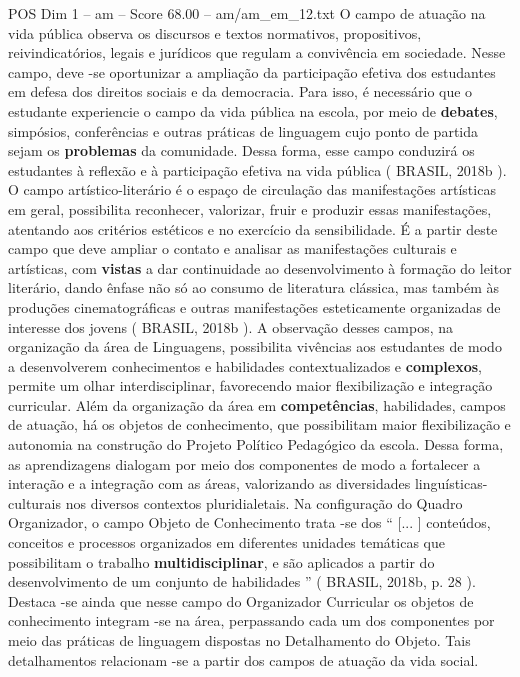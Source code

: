 \begin{textsample}{POS Dim 1 – am – Score 68.00 – am/am\_em\_12.txt}
O campo de atuação na vida pública observa os discursos e textos normativos, propositivos, reivindicatórios, legais e jurídicos que regulam a convivência em sociedade.
Nesse campo, deve -se oportunizar a ampliação da participação efetiva dos estudantes em defesa dos direitos sociais e da democracia.
Para isso, é necessário que o estudante experiencie o campo da vida pública na escola, por meio de \textbf{debates}, simpósios, conferências e outras práticas de linguagem cujo ponto de partida sejam os \textbf{problemas} da comunidade.
Dessa forma, esse campo conduzirá os estudantes à reflexão e à participação efetiva na vida pública ( BRASIL, 2018b ).
O campo artístico-literário é o espaço de circulação das manifestações artísticas em geral, possibilita reconhecer, valorizar, fruir e produzir essas manifestações, atentando aos critérios estéticos e no exercício da sensibilidade.
É a partir deste campo que deve ampliar o contato e analisar as manifestações culturais e artísticas, com \textbf{vistas} a dar continuidade ao desenvolvimento à formação do leitor literário, dando ênfase não só ao consumo de literatura clássica, mas também às produções cinematográficas e outras manifestações esteticamente organizadas de interesse dos jovens ( BRASIL, 2018b ).
A observação desses campos, na organização da área de Linguagens, possibilita vivências aos estudantes de modo a desenvolverem conhecimentos e habilidades contextualizados e \textbf{complexos}, permite um olhar interdisciplinar, favorecendo maior flexibilização e integração curricular.
Além da organização da área em \textbf{competências}, habilidades, campos de atuação, há os objetos de conhecimento, que possibilitam maior flexibilização e autonomia na construção do Projeto Político Pedagógico da escola.
Dessa forma, as aprendizagens dialogam por meio dos componentes de modo a fortalecer a interação e a integração com as áreas, valorizando as diversidades linguísticas-culturais nos diversos contextos pluridialetais.
Na configuração do Quadro Organizador, o campo Objeto de Conhecimento trata -se dos “ [... ] conteúdos, conceitos e processos organizados em diferentes unidades temáticas que possibilitam o trabalho \textbf{multidisciplinar}, e são aplicados a partir do desenvolvimento de um conjunto de habilidades ” ( BRASIL, 2018b, p. 28 ).
Destaca -se ainda que nesse campo do Organizador Curricular os objetos de conhecimento integram -se na área, perpassando cada um dos componentes por meio das práticas de linguagem dispostas no Detalhamento do Objeto.
Tais detalhamentos relacionam -se a partir dos campos de atuação da vida social.

\end{textsample}
